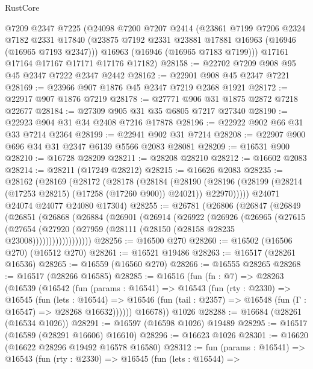 \begin{lexlean}{RustCore}
\begin{coremodule}
    @7209
    @2347
    @7225
    (@24098
      @7200
      @7207
      @2414
      (@23861
        @7199
        @7206
        @2324
        @7182
        @2331
        @17840
        (@23875 @7192 @2331 @23881 @17881 @16963 (@16946 (@16965 @7193 @2347)))
        @16963
        (@16946 (@16965 @7183 @7199)))
      @17161
      @17164
      @17167
      @17171
      @17176
      @17182)
@28158 := @22702 @7209 @908 @95 @45 @2347 @7222 @2347 @2442
@28162 := @22901 @908 @45 @2347 @7221
@28169 := @23966 @907 @1876 @45 @2347 @7219 @2368 @1921
@28172 := @22917 @907 @1876 @7219
@28178 := @27771 @906 @31 @1875 @2872 @7218 @22677
@28184 := @27309 @905 @31 @35 @6805 @7217 @27340
@28190 := @22923 @904 @31 @34 @2408 @7216 @17878
@28196 := @22922 @902 @66 @31 @33 @7214 @2364
@28199 := @22941 @902 @31 @7214
@28208 := @22907 @900 @696 @34 @31 @2347 @6139 @5566 @2083 @28081
@28209 := @16531 @900
@28210 := @16728 @28209
@28211 := @28208 @28210
@28212 := @16602 @2083
@28214 := @28211 (@17249 @28212)
@28215 := @16626 @2083
@28235 := @28162
    (@28169
      (@28172
        (@28178
          (@28184
            (@28190
              (@28196 (@28199 (@28214 (@17253 @28215) (@17258 (@17260 @900)) @24021)) @22970)))))
      @24071
      @24074
      @24077
      @24080
      @17304)
@28255 := @26781
    (@26806
      (@26847
        (@26849
          (@26851
            (@26868
              (@26884
                (@26901
                  (@26914
                    (@26922
                      (@26926
                        (@26965
                          (@27615
                            (@27654
                              (@27920
                                (@27959 (@28111 (@28150 (@28158 @28235 @23008))))))))))))))))))
@28256 := @16500 @270
@28260 := @16502 (@16506 @270) (@16512 @270)
@28261 := @16521 @19486
@28263 := @16517 (@28261 @16536)
@28265 := @16559 (@16560 @270)
@28266 := @16555 @28265
@28268 := @16517 (@28266 @16585)
@28285 := @16516
    (fun (fn : @7) =>
    @28263
      (@16539
        (@16542
          (fun (params : @16541) =>
          @16543
            (fun (rty : @2330) =>
            @16545
              (fun (lets : @16544) =>
              @16546 (fun (tail : @2357) => @16548 (fun (Γ : @16547) => @28268 @16632))))))
        @16678))
    @1026
@28288 := @16684 (@28261 (@16534 @1026))
@28291 := @16597 (@16598 @1026) @19489
@28295 := @16517 (@16589 (@28291 @16606) @16610)
@28296 := @16623 @1026
@28301 := @16620 (@16622 @28296 @19492 @16578 @16580)
@28312 := fun (params : @16541) =>
  @16543
    (fun (rty : @2330) =>
    @16545
      (fun (lets : @16544) =>

\end{coremodule}
\end{lexlean}
